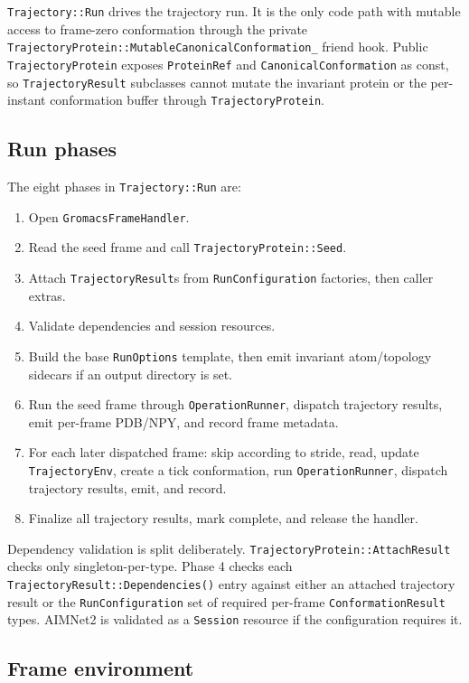 \documentclass[11pt]{article}
\newcommand{\code}[1]{\texttt{#1}}
\begin{document}
\code{Trajectory::Run} drives the trajectory run. It is the only code path
with mutable access to frame-zero conformation through the private
\code{TrajectoryProtein::MutableCanonicalConformation\_} friend hook. Public
\code{TrajectoryProtein} exposes \code{ProteinRef} and
\code{CanonicalConformation} as const, so \code{TrajectoryResult} subclasses
cannot mutate the invariant protein or the per-instant conformation buffer
through \code{TrajectoryProtein}.

\subsection{Run phases}

The eight phases in \code{Trajectory::Run} are:

\begin{enumerate}
\item Open \code{GromacsFrameHandler}.
\item Read the seed frame and call \code{TrajectoryProtein::Seed}.
\item Attach \code{TrajectoryResult}s from \code{RunConfiguration} factories,
then caller extras.
\item Validate dependencies and session resources.
\item Build the base \code{RunOptions} template, then emit invariant
atom/topology sidecars if an output directory is set.
\item Run the seed frame through \code{OperationRunner}, dispatch trajectory
results, emit per-frame PDB/NPY, and record frame metadata.
\item For each later dispatched frame: skip according to stride, read, update
\code{TrajectoryEnv}, create a tick conformation, run
\code{OperationRunner}, dispatch trajectory results, emit, and record.
\item Finalize all trajectory results, mark complete, and release the handler.
\end{enumerate}

Dependency validation is split deliberately. \code{TrajectoryProtein::AttachResult}
checks only singleton-per-type. Phase 4 checks each
\code{TrajectoryResult::Dependencies()} entry against either an attached
trajectory result or the \code{RunConfiguration} set of required
per-frame \code{ConformationResult} types. AIMNet2 is validated as a
\code{Session} resource if the configuration requires it.

\subsection{Frame environment}
\end{document}
